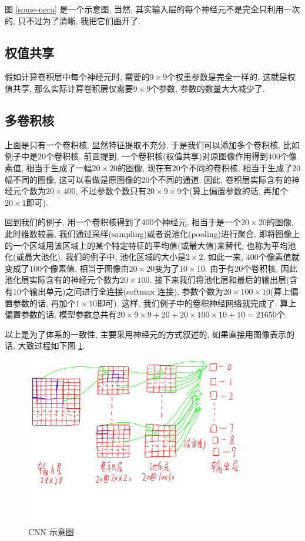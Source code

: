 \documentclass[a4paper,UTF8]{ctexart}
\theoremstyle{plain} \newtheorem{theorem}{定理}[section]
\theoremstyle{plain} \newtheorem{definition}{定义}[section]
\theoremstyle{plain} \newtheorem{lemma}{引理}[section]
\theoremstyle{plain} \newtheorem{proposition}{命题}[section]
\theoremstyle{plain} \newtheorem{example}{例}[section]
\theoremstyle{plain} \newtheorem{remark}{注}[section]
\theoremstyle{plain} \newtheorem{corollary}{推论}[section]
\begin{document}
图 \ref{some-neru} 是一个示意图, 当然, 其实输入层的每个神经元不是完全只利用一次的, 只不过为了清晰, 我把它们画开了.

\subsection{权值共享}
假如计算卷积层中每个神经元时, 需要的$9 \times 9$个权重参数是完全一样的, 这就是权值共享, 那么实际计算卷积层仅需要$9 \times 9$个参数, 参数的数量大大减少了.

\subsection{多卷积核}
上面是只有一个卷积核, 显然特征提取不充分, 于是我们可以添加多个卷积核, 比如例子中是$20$个卷积核. 前面提到, 一个卷积核(权值共享)对原图像作用得到$400$个像素值, 相当于生成了一幅$20 \times 20$的图像, 现在有$20$个不同的卷积核, 相当于生成了$20$幅不同的图像, 这可以看做是原图像的$20$个不同的通道. 因此, 卷积层实际含有的神经元个数为$20 \times 400$, 不过参数个数只有$20 \times 9 \times 9$个(算上偏置参数的话, 再加个$20 \times 1$即可).

回到我们的例子, 用一个卷积核得到了$400$个神经元, 相当于是一个$20 \times 20$的图像, 此时维数较高, 我们通过采样(sampling)或者说池化(pooling)进行聚合, 即将图像上的一个区域用该区域上的某个特定特征的平均值(或最大值)来替代, 也称为平均池化(或最大池化). 我们的例子中, 池化区域的大小是$2 \times 2$, 如此一来, $400$个像素值就变成了$100$个像素值, 相当于图像由$20 \times 20$变为了$10 \times 10$. 由于有$20$个卷积核, 因此池化层实际含有的神经元个数为$20 \times 100$. 接下来我们将池化层和最后的输出层(含有$10$个输出单元)之间进行全连接(softmax 连接), 参数个数为$20 \times 100 \times 10$(算上偏置参数的话, 再加个$1 \times 10$即可). 这样, 我们例子中的卷积神经网络就完成了. 算上偏置参数的话, 模型参数总共有$20 \times 9 \times 9 + 20 + 20 \times 100 \times 10 + 10 = 21650$个.

以上是为了体系的一致性, 主要采用神经元的方式叙述的, 如果直接用图像表示的话, 大致过程如下图 \ref{convole}.
\begin{figure}[!htb]
	\centering
	\includegraphics[width=0.85\textwidth]{convole.pdf}
	\caption{CNN 示意图}
	\label{convole}
\end{figure}
\end{document}
